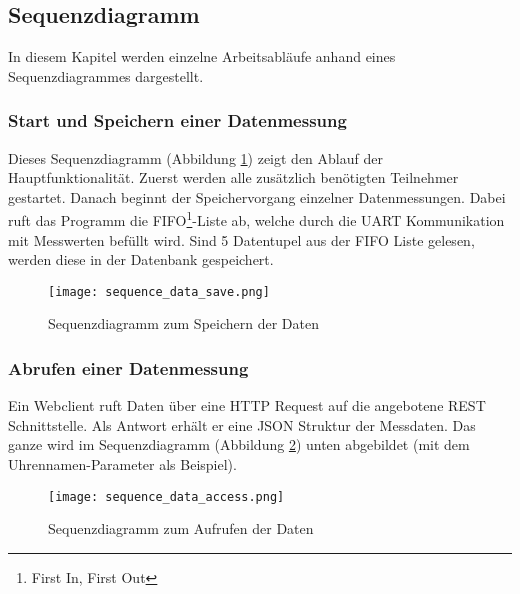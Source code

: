 \subsection{Sequenzdiagramm}
In diesem Kapitel werden einzelne Arbeitsabläufe anhand eines Sequenzdiagrammes dargestellt.
	\subsubsection{Start und Speichern einer Datenmessung}
    Dieses Sequenzdiagramm (Abbildung \ref{fig:sequence_save}) zeigt den Ablauf der Hauptfunktionalität.
    Zuerst werden alle zusätzlich benötigten Teilnehmer gestartet.
    Danach beginnt der Speichervorgang einzelner Datenmessungen.
    Dabei ruft das Programm die FIFO\footnote{First In, First Out}-Liste ab, welche durch die UART Kommunikation mit Messwerten befüllt wird.
    Sind 5 Datentupel aus der FIFO Liste gelesen, werden diese in der Datenbank gespeichert.
    \begin{figure}[H]
        \centering
        \texttt{[image: sequence\_data\_save.png]}
        \caption{Sequenzdiagramm zum Speichern der Daten}
        \label{fig:sequence_save}
    \end{figure}

    \clearpage
    \subsubsection{Abrufen einer Datenmessung}
    Ein Webclient ruft Daten über eine HTTP Request auf die angebotene REST Schnittstelle.
    Als Antwort erhält er eine JSON Struktur der Messdaten.
    Das ganze wird im Sequenzdiagramm (Abbildung \ref{fig:sequence_get}) unten abgebildet (mit dem Uhrennamen-Parameter als Beispiel).
    \begin{figure}[H]
        \centering
        \texttt{[image: sequence\_data\_access.png]}
        \caption{Sequenzdiagramm zum Aufrufen der Daten}
        \label{fig:sequence_get}
    \end{figure}
